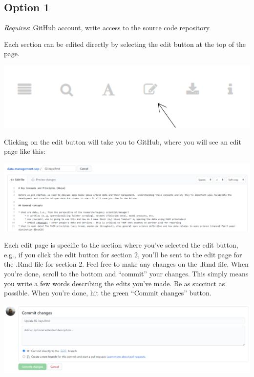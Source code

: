\documentclass[
]{book}
\begin{document}
\hypertarget{opt1}{%
\subsection{Option 1}\label{opt1}}

\emph{Requires}: GitHub account, write access to the source code repository

Each section can be edited directly by selecting the edit button at the top of the page.

\begin{center}\includegraphics[width=1\linewidth]{img/editarrow} \end{center}

Clicking on the edit button will take you to GitHub, where you will see an edit page like this:

\begin{center}\includegraphics[width=1\linewidth]{img/editme} \end{center}

Each edit page is specific to the section where you've selected the edit button, e.g., if you click the edit button for section 2, you'll be sent to the edit page for the .Rmd file for section 2. Feel free to make any changes on the .Rmd file. When you're done, scroll to the bottom and ``commit'' your changes. This simply means you write a few words describing the edits you've made. Be as succinct as possible. When you're done, hit the green ``Commit changes'' button.

\begin{center}\includegraphics[width=1\linewidth]{img/editme2} \end{center}
\end{document}

